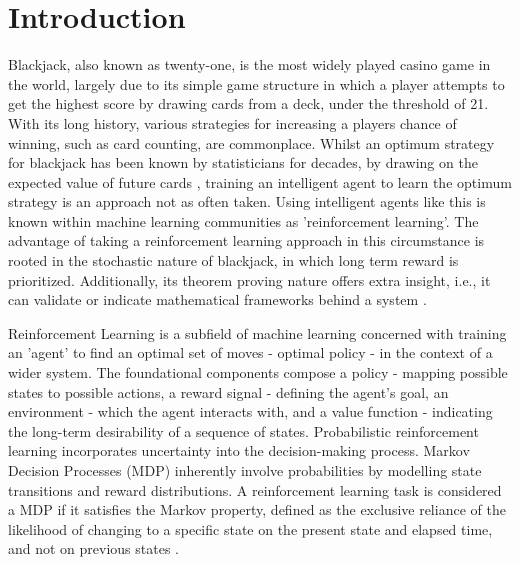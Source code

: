 \section{Introduction}

Blackjack, also known as twenty-one, is the most widely played casino game in the world, largely due to its simple game structure in which a player attempts to get the highest score by drawing cards from a deck, under the threshold of 21. With its long history, various strategies for increasing a players chance of winning, such as card counting, are commonplace. Whilst an optimum strategy for blackjack has been known by statisticians for decades, by drawing on the expected value of future cards \cite{Baldwin01091956}, training an intelligent agent to learn the optimum strategy is an approach not as often taken. Using intelligent agents like this is known within machine learning communities as 'reinforcement learning'. The advantage of taking a reinforcement learning approach in this circumstance is rooted in the stochastic nature of blackjack, in which long term reward is prioritized. Additionally, its theorem proving nature offers extra insight, i.e., it can validate or indicate mathematical frameworks behind a system \cite{bidi2023reinforcementlearningcontroltheory}. 

\smallskip
Reinforcement Learning is a subfield of machine learning concerned with training an 'agent' to find an optimal set of moves - optimal policy - in the context of a wider system. The foundational components compose a policy - mapping possible states to possible actions, a reward signal - defining the agent's goal, an environment - which the agent interacts with, and a value function - indicating the long-term desirability of a sequence of states. Probabilistic reinforcement learning incorporates uncertainty into the decision-making process. Markov Decision Processes (MDP) inherently involve probabilities by modelling state transitions and reward distributions. A reinforcement learning task is considered a MDP if it satisfies the Markov property, defined as the exclusive reliance of the likelihood of changing to a specific state on the present state and elapsed time, and not on previous states \cite{10.5555/3312046}.



